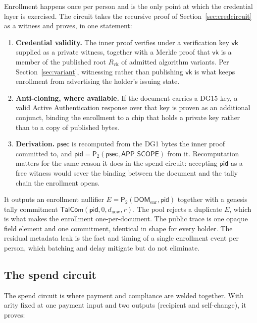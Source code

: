 \documentclass[11pt,a4paper]{article}
\theoremstyle{definition}
\theoremstyle{plain}
\theoremstyle{remark}
\newcommand{\pid}{\ensuremath{\mathsf{pid}}}
\newcommand{\psec}{\ensuremath{\mathsf{psec}}}
\newcommand{\Tcom}{\ensuremath{\mathsf{TalCom}}}
\newcommand{\PT}{\ensuremath{\mathsf{P}_2}}
\begin{document}
Enrollment happens once per person and is the only point at which the credential layer is exercised. The circuit takes the recursive proof of Section~\ref{sec:credcircuit} as a witness and proves, in one statement:

\begin{enumerate}
\item \textbf{Credential validity.} The inner proof verifies under a verification key $\mathsf{vk}$ supplied as a private witness, together with a Merkle proof that $\mathsf{vk}$ is a member of the published root $R_{\mathrm{vk}}$ of admitted algorithm variants. Per Section~\ref{sec:variant}, witnessing rather than publishing $\mathsf{vk}$ is what keeps enrollment from advertising the holder's issuing state.
\item \textbf{Anti-cloning, where available.} If the document carries a DG15 key, a valid Active Authentication response over that key is proven as an additional conjunct, binding the enrollment to a chip that holds a private key rather than to a copy of published bytes.
\item \textbf{Derivation.} $\psec$ is recomputed from the DG1 bytes the inner proof committed to, and $\pid = \PT(\psec, \mathsf{APP\_SCOPE})$ from it. Recomputation matters for the same reason it does in the spend circuit: accepting $\pid$ as a free witness would sever the binding between the document and the tally chain the enrollment opens.
\end{enumerate}

It outputs an enrollment nullifier $E = \PT(\mathsf{DOM}_{\mathrm{enr}}, \pid)$ together with a genesis tally commitment $\Tcom(\pid, 0, d_{\mathrm{now}}, r)$. The pool rejects a duplicate $E$, which is what makes the enrollment one-per-document. The public trace is one opaque field element and one commitment, identical in shape for every holder. The residual metadata leak is the fact and timing of a single enrollment event per person, which batching and delay mitigate but do not eliminate.

\subsection{The spend circuit}

The spend circuit is where payment and compliance are welded together. With arity fixed at one payment input and two outputs (recipient and self-change), it proves:
\end{document}

